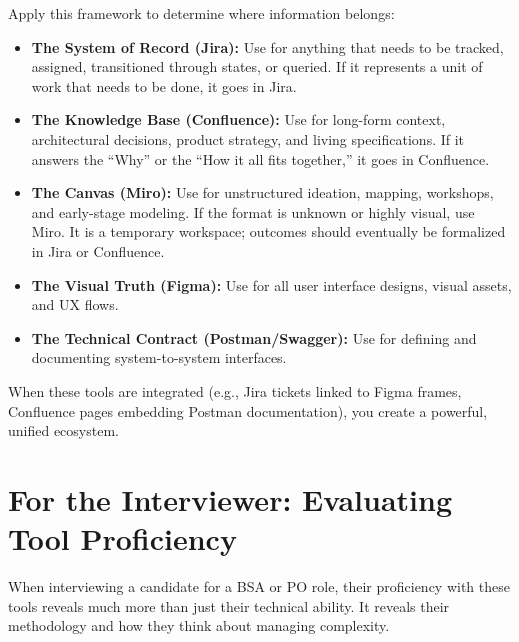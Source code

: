 Apply this framework to determine where information belongs:

\begin{itemize}
\tightlist
\item
  \textbf{The System of Record (Jira):} Use for anything that needs to
  be tracked, assigned, transitioned through states, or queried. If it
  represents a unit of work that needs to be done, it goes in Jira.
\item
  \textbf{The Knowledge Base (Confluence):} Use for long-form context,
  architectural decisions, product strategy, and living specifications.
  If it answers the ``Why'' or the ``How it all fits together,'' it goes
  in Confluence.
\item
  \textbf{The Canvas (Miro):} Use for unstructured ideation, mapping,
  workshops, and early-stage modeling. If the format is unknown or
  highly visual, use Miro. It is a temporary workspace; outcomes should
  eventually be formalized in Jira or Confluence.
\item
  \textbf{The Visual Truth (Figma):} Use for all user interface designs,
  visual assets, and UX flows.
\item
  \textbf{The Technical Contract (Postman/Swagger):} Use for defining
  and documenting system-to-system interfaces.
\end{itemize}

When these tools are integrated (e.g., Jira tickets linked to Figma
frames, Confluence pages embedding Postman documentation), you create a
powerful, unified ecosystem.

\section{For the Interviewer: Evaluating Tool
Proficiency}\label{for-the-interviewer-evaluating-tool-proficiency}

When interviewing a candidate for a BSA or PO role, their proficiency
with these tools reveals much more than just their technical ability. It
reveals their methodology and how they think about managing complexity.

